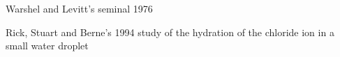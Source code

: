 
Warshel and Levitt’s seminal 1976

Rick, Stuart and Berne’s 1994 study of the hydration of the chloride ion in a small water droplet

